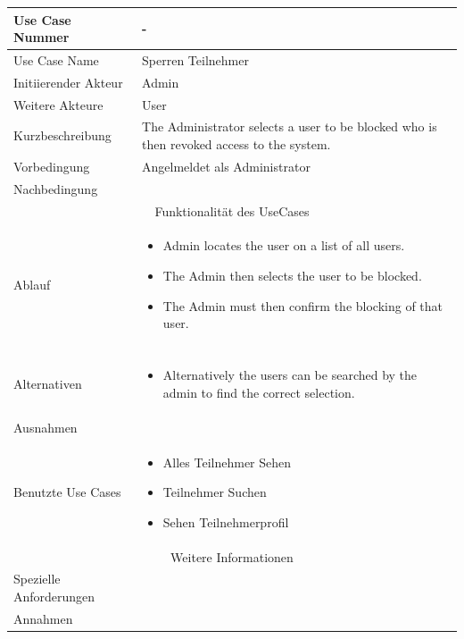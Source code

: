 \documentclass[10pt,a4paper]{article}
\begin{document}
	\begin{tabular}{|l|p{.5\linewidth}|}
	\hline Use Case Nummer & - \\ 
	\hline Use Case Name & Sperren Teilnehmer \\ 
	\hline Initiierender Akteur & Admin \\
	\hline Weitere Akteure & User \\
	\hline Kurzbeschreibung & The Administrator selects a user to be blocked who is then revoked access to the system. \\
	\hline Vorbedingung & Angelmeldet als Administrator \\
	\hline Nachbedingung &  \\
	\hline \multicolumn{2}{|c|}{Funktionalität des UseCases}\\
	\hline Ablauf & \begin{itemize}
			\item Admin locates the user on a list of all users.
			\item The Admin then selects the user to be blocked.
			\item The Admin must then confirm the blocking of that user.
		\end{itemize} \\ \\
	\hline Alternativen & \begin{itemize}
			\item Alternatively the users can be searched by the admin to find the correct selection.
		\end{itemize} \\
	\hline Ausnahmen &  \\
	\hline Benutzte Use Cases & \begin{itemize}
			\item Alles Teilnehmer Sehen
			\item Teilnehmer Suchen
			\item Sehen Teilnehmerprofil
		\end{itemize} \\
	\hline \multicolumn{2}{|c|}{Weitere Informationen} \\
	\hline Spezielle Anforderungen &  \\
	\hline Annahmen &  \\
	\hline
	\end{tabular}
	
\end{document}
